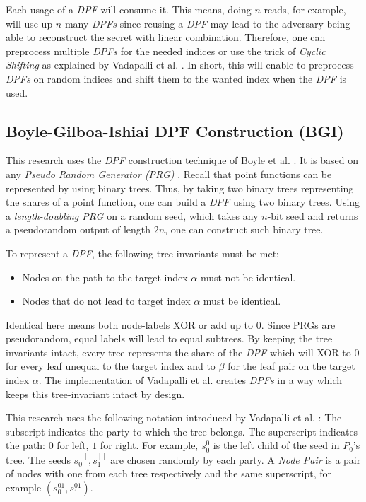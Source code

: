 Each usage of a \textit{DPF} will consume it.
This means, doing $n$ reads, for example, will use up $n$ many \textit{DPFs} since reusing a \textit{DPF} may lead to the adversary being able to reconstruct the secret with linear combination.
Therefore, one can preprocess multiple \textit{DPFs} for the needed indices or use the trick of \textit{Cyclic Shifting} as explained by Vadapalli et al. \cite{vadapalli2023duoram}.
In short, this will enable to preprocess \textit{DPFs} on random indices and shift them to the wanted index when the \textit{DPF} is used.

\subsection{Boyle-Gilboa-Ishiai DPF Construction (BGI)} \label{sub:BGIDPFConstruction}
This research uses the \textit{DPF} construction technique of Boyle et al. \cite{boyle2016function}.
It is based on any \textit{Pseudo Random Generator (PRG)} \cite{vadapalli2023duoram}.
Recall that point functions can be represented by using binary trees.
Thus, by taking two binary trees representing the shares of a point function, one can build a \textit{DPF} using two binary trees.
Using a \textit{length-doubling PRG} on a random seed, which takes any $n$-bit seed and returns a pseudorandom output of length $2n$, one can construct such binary tree.

To represent a \textit{DPF}, the following tree invariants \cite{boyle2023information} must be met:
\begin{itemize}
   \item Nodes on the path to the target index $\alpha$ must not be identical.
   \item Nodes that do not lead to target index $\alpha$ must be identical. 
\end{itemize}
Identical here means both node-labels XOR or add up to $0$.
Since PRGs are pseudorandom, equal labels will lead to equal subtrees.
By keeping the tree invariants intact, every tree represents the share of the \textit{DPF} which will XOR to $0$ for every leaf unequal to the target index and to $\beta$ for the leaf pair on the target index $\alpha$.
The implementation of Vadapalli et al. \cite{vadapalli2023duoram} creates \textit{DPFs} in a way which keeps this tree-invariant intact by design.

This research uses the following notation introduced by Vadapalli et al. \cite{vadapalli2023duoram}:
The subscript indicates the party to which the tree belongs.
The superscript indicates the path: $0$ for left, $1$ for right.
For example, $s_0^0$ is the left child of the seed in $P_0$'s tree.
The seeds $s_0^{[]},s_1^{[]}$ are chosen randomly by each party.
A \textit{Node Pair} is a pair of nodes with one from each tree respectively and the same superscript, for example $(s_0^{01},s_1^{01})$.

